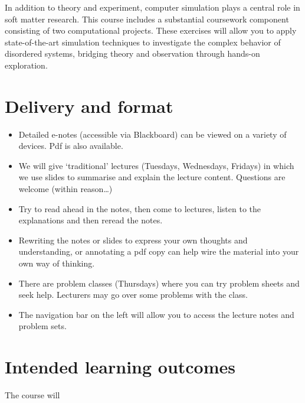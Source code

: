 \documentclass[
  letterpaper,
  DIV=11,
  numbers=noendperiod]{scrreprt}
\begin{document}
In addition to theory and experiment, computer simulation plays a
central role in soft matter research. This course includes a substantial
coursework component consisting of two computational projects. These
exercises will allow you to apply state-of-the-art simulation techniques
to investigate the complex behavior of disordered systems, bridging
theory and observation through hands-on exploration.

\section*{Delivery and format}\label{delivery-and-format}


\begin{itemize}
\item
  Detailed e-notes (accessible via Blackboard) can be viewed on a
  variety of devices. Pdf is also available.
\item
  We will give `traditional' lectures (Tuesdays, Wednesdays, Fridays) in
  which we use slides to summarise and explain the lecture content.
  Questions are welcome (within reason\ldots)
\item
  Try to read ahead in the notes, then come to lectures, listen to the
  explanations and then reread the notes.
\item
  Rewriting the notes or slides to express your own thoughts and
  understanding, or annotating a pdf copy can help wire the material
  into your own way of thinking.
\item
  There are problem classes (Thursdays) where you can try problem sheets
  and seek help. Lecturers may go over some problems with the class.
\item
  The navigation bar on the left will allow you to access the lecture
  notes and problem sets.
\end{itemize}

\section*{Intended learning outcomes}\label{intended-learning-outcomes}


The course will
\end{document}

